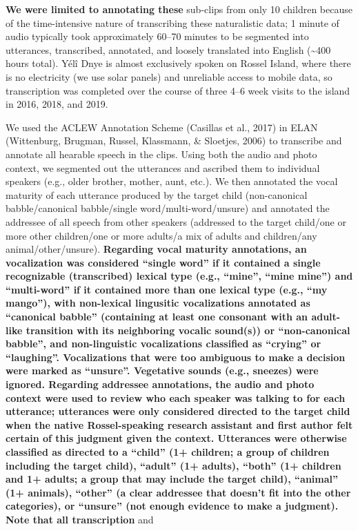 \documentclass[,man,floatsintext]{apa6}
\begin{document}
\textbf{We were limited to annotating these} sub-clips from only 10
children because of the time-intensive nature of transcribing these
naturalistic data; 1 minute of audio typically took approximately 60--70
minutes to be segmented into utterances, transcribed, annotated, and
loosely translated into English (\textasciitilde{}400 hours total). Yélî
Dnye is almost exclusively spoken on Rossel Island, where there is no
electricity (we use solar panels) and unreliable access to mobile data,
so transcription was completed over the course of three 4--6 week visits
to the island in 2016, 2018, and 2019.

We used the ACLEW Annotation Scheme (Casillas et al., 2017) in ELAN
(Wittenburg, Brugman, Russel, Klassmann, \& Sloetjes, 2006) to
transcribe and annotate all hearable speech in the clips. Using both the
audio and photo context, we segmented out the utterances and ascribed
them to individual speakers (e.g., older brother, mother, aunt, etc.).
We then annotated the vocal maturity of each utterance produced by the
target child (non-canonical babble/canonical babble/single
word/multi-word/unsure) and annotated the addressee of all speech from
other speakers (addressed to the target child/one or more other
children/one or more adults/a mix of adults and children/any
animal/other/unsure). \textbf{Regarding vocal maturity annotations, an
vocalization was considered \enquote{single word} if it contained a
single recognizable (transcribed) lexical type (e.g., \enquote{mine},
\enquote{mine mine}) and \enquote{multi-word} if it contained more than
one lexical type (e.g., \enquote{my mango}), with non-lexical lingusitic
vocalizations annotated as \enquote{canonical babble} (containing at
least one consonant with an adult-like transition with its neighboring
vocalic sound(s)) or \enquote{non-canonical babble}, and non-linguistic
vocalizations classified as \enquote{crying} or \enquote{laughing}.
Vocalizations that were too ambiguous to make a decision were marked as
\enquote{unsure}. Vegetative sounds (e.g., sneezes) were ignored.
Regarding addressee annotations, the audio and photo context were used
to review who each speaker was talking to for each utterance; utterances
were only considered directed to the target child when the native
Rossel-speaking research assistant and first author felt certain of this
judgment given the context. Utterances were otherwise classified as
directed to a \enquote{child} (1+ children; a group of children
including the target child), \enquote{adult} (1+ adults), \enquote{both}
(1+ children and 1+ adults; a group that may include the target child),
\enquote{animal} (1+ animals), \enquote{other} (a clear addressee that
doesn't fit into the other categories), or \enquote{unsure} (not enough
evidence to make a judgment). Note that all transcription} and
\end{document}
